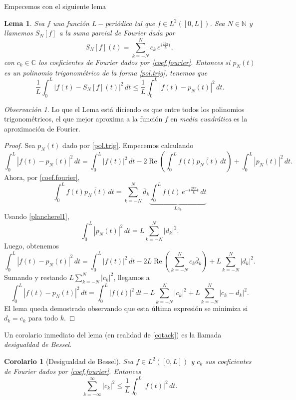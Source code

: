 \documentclass[12pt, a4paper]{amsbook}
\renewcommand{\Re}{\operatorname{Re}}
\newcommand{\C}{{\mathbb C}}
\newcommand{\N}{{\mathbb N}}
\newtheorem{lema}[teo]{Lema}
\newtheorem{cor}[teo]{Corolario}
\theoremstyle{remark}
\newtheorem{obs}[teo]{Observación}
\theoremstyle{definition}
\numberwithin{section}{chapter}
\numberwithin{subsection}{section}
\numberwithin{equation}{section}
\numberwithin{figure}{chapter}
\begin{document}
Empecemos con el siguiente lema
\begin{lema}\label{mejor.aprox}
Sea $f$ una función $L-$periódica tal que $f\in L^2([0,L])$. Sea $N\in\N$ y llamemos $S_N[f]$ a la suma parcial de Fourier dada por 
$$
S_N[f](t) = \sum_{k=-N}^N c_k\, e^{i\frac{2k\pi}{L} t},
$$
con $c_k\in\C$ los coeficientes de Fourier dados por \eqref{coef.fourier}. Entonces si $p_N(t)$ es un polinomio trigonométrico de la forma \eqref{pol.trig}, tenemos que
$$
\frac{1}{L}\int_0^L |f(t)-S_N[f](t)|^2\, dt \le \frac{1}{L}\int_0^L |f(t)-p_N(t)|^2\, dt.
$$
\end{lema}

\begin{obs}
Lo que el Lema está diciendo es que entre todos los polinomios trigonométricos, el que mejor aproxima a la función $f$ en {\em media cuadrática} es la aproximación de Fourier.
\end{obs}

\begin{proof}
Sea $p_N(t)$ dado por \eqref{pol.trig}. Empecemos calculando 
$$
\int_0^L |f(t)-p_N(t)|^2\, dt = \int_0^L |f(t)|^2\, dt - 2\Re\left(\int_0^L f(t)\overline{p_N(t)}\, dt\right) + \int_0^L |p_N(t)|^2\, dt.
$$
Ahora, por \eqref{coef.fourier},
$$
\int_0^L f(t)\overline{p_N(t)}\, dt = \sum_{k=-N}^N \bar d_k \underbrace{\int_0^L f(t)\, e^{-i\frac{2k\pi}{L}t}\, dt}_{L c_k}
$$
Usando \eqref{plancherel1}, 
$$
\int_0^L |p_N(t)|^2\, dt = L \sum_{k=-N}^N |d_k|^2.
$$
Luego, obtenemos
$$
\int_0^L |f(t)-p_N(t)|^2\, dt = \int_0^L |f(t)|^2\, dt - 2L\Re\left(\sum_{k=-N}^N c_k \bar d_k\right) + L \sum_{k=-N}^N |d_k|^2.
$$
Sumando y restando $L\sum_{k=-N}^N |c_k|^2$, llegamos a
\begin{equation}\label{cotack}
\int_0^L |f(t)-p_N(t)|^2\, dt = \int_0^L |f(t)|^2\, dt - L\sum_{k=-N}^N |c_k|^2 + L\sum_{k=-N}^N |c_k-d_k|^2.
\end{equation}
El lema queda demostrado observando que esta última expresión se minimiza si $d_k=c_k$ para todo $k$.
\end{proof}

Un corolario inmediato del lema (en realidad de \eqref{cotack}) es la llamada {\em desigualdad de Bessel}.
\begin{cor}[Desigualdad de Bessel]
Sea $f\in L^2([0,L])$ y $c_k$ sus coeficientes de Fourier dados por \eqref{coef.fourier}. Entonces
\begin{equation}\label{Bessel}
\sum_{k=-\infty}^\infty |c_k|^2\le \frac{1}{L}\int_0^L |f(t)|^2\, dt.
\end{equation}
\end{cor}
\end{document}
